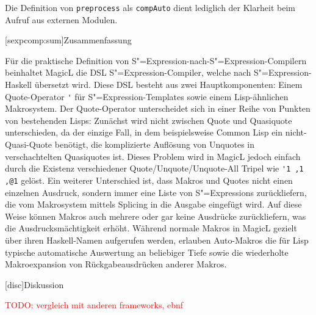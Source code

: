 \documentclass[12pt, a4paper, bibgerm]{scrbook}
\newcommand\icode[1]{\lstinline?#1?}
\newcommand{\todo}[1]{
  \textcolor{red}{TODO: #1}
}
\newcommand\lchapter{}
\newcommand\lsection{}
\newcommand{\sexp}{S"=Expression}
\newcommand{\sexps}{S"=Expressions}
\begin{document}
Die Definition von \icode{preprocess} als \icode{compAuto} dient
lediglich der Klarheit beim Aufruf aus externen Modulen.

\lsection[sexpcomp:sum]{Zusammenfassung}

Für die praktische Definition von \sexp{}-nach-\sexp{}-Compilern
beinhaltet MagicL die DSL \sexp{}-Compiler, welche nach \sexp{}-Haskell
übersetzt wird. Diese DSL besteht aus zwei Hauptkomponenten: Einem
Quote-Operator \icode{'} für \sexp{}-Templates sowie einem
Lisp-ähnlichen Makrosystem. Der Quote-Operator unterscheidet sich in
einer Reihe von Punkten von bestehenden Lisps: Zunächst wird nicht
zwischen Quote und Quasiquote unterschieden, da der einzige Fall, in dem
beispielsweise Common Lisp ein nicht-Quasi-Quote benötigt, die
komplizierte Auflösung von Unquotes in verschachtelten Quasiquotes
ist. Dieses Problem wird in MagicL jedoch einfach durch die Existenz
verschiedener Quote/Unquote/Unquote-All Tripel wie \icode{'1 ,1 ,@1}
gelöst. Ein weiterer Unterschied ist, dass Makros und Quotes nicht einen
einzelnen Ausdruck, sondern immer eine Liste von \sexps{} zurückliefern,
die vom Makrosystem mittels Splicing in die Ausgabe eingefügt wird. Auf
diese Weise können Makros auch mehrere oder gar keine Ausdrücke
zurückliefern, was die Ausdrucksmächtigkeit erhöht. Während normale
Makros in MagicL gezielt über ihren Haskell-Namen aufgerufen werden,
erlauben Auto-Makros die für Lisp typische automatische Auswertung an
beliebiger Tiefe sowie die wiederholte Makroexpansion von
Rückgabeausdrücken anderer Makros.

\lchapter[disc]{Diskussion}

\todo{vergleich mit anderen frameworks, ebnf}
\end{document}
